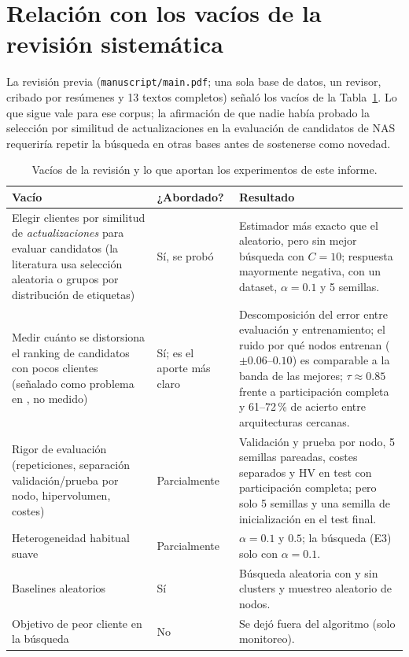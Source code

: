 \documentclass[11pt,a4paper]{article}
\begin{document}
\section{Relación con los vacíos de la revisión sistemática}\label{sec:vacios}
La revisión previa (\texttt{manuscript/main.pdf}; una sola base de datos, un revisor, cribado por resúmenes y 13 textos completos) señaló los vacíos de la Tabla~\ref{tab:vacios}. Lo que sigue vale para ese corpus; la afirmación de que nadie había probado la selección por similitud de actualizaciones en la evaluación de candidatos de NAS requeriría repetir la búsqueda en otras bases antes de sostenerse como novedad.
\begin{table}[H]\centering\scriptsize
\caption{Vacíos de la revisión y lo que aportan los experimentos de este informe.}\label{tab:vacios}
\begin{tabular}{@{}p{3.6cm}p{2.2cm}p{8.4cm}@{}}\toprule
Vacío & ¿Abordado? & Resultado\\\midrule
Elegir clientes por similitud de \emph{actualizaciones} para evaluar candidatos (la literatura usa selección aleatoria o grupos por distribución de etiquetas) & Sí, se probó & Estimador más exacto que el aleatorio, pero sin mejor búsqueda con $C=10$; respuesta mayormente negativa, con un dataset, $\alpha=0.1$ y 5 semillas.\\
Medir cuánto se distorsiona el ranking de candidatos con pocos clientes (señalado como problema en \cite{khodak2021federated}, no medido) & Sí; es el aporte más claro & Descomposición del error entre evaluación y entrenamiento; el ruido por qué nodos entrenan ($\pm0.06$--$0.10$) es comparable a la banda de las mejores; $\tau\approx0.85$ frente a participación completa y 61--72\,\% de acierto entre arquitecturas cercanas.\\
Rigor de evaluación (repeticiones, separación validación/prueba por nodo, hipervolumen, costes) & Parcialmente & Validación y prueba por nodo, 5 semillas pareadas, costes separados y HV en test con participación completa; pero solo 5 semillas y una semilla de inicialización en el test final.\\
Heterogeneidad habitual suave & Parcialmente & $\alpha=0.1$ y $0.5$; la búsqueda (E3) solo con $\alpha=0.1$.\\
Baselines aleatorios & Sí & Búsqueda aleatoria con y sin clusters y muestreo aleatorio de nodos.\\
Objetivo de peor cliente en la búsqueda & No & Se dejó fuera del algoritmo (solo monitoreo).\\\bottomrule
\end{tabular}\end{table}
\end{document}
